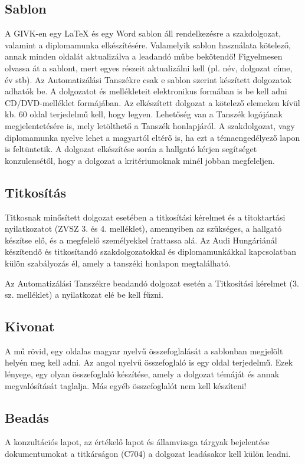 \subsection{Sablon}
A GIVK-en egy \LaTeX{} és egy Word sablon áll rendelkezésre a szakdolgozat, valamint a diplomamunka elkészítésére. Valamelyik sablon használata kötelező, annak minden oldalát aktualizálva a leadandó műbe bekötendő! Figyelmesen olvassa át a sablont, mert egyes részeit aktualizálni kell (pl. név, dolgozat címe, év stb). Az Automatizálási Tanszékre csak e sablon szerint készített dolgozatok adhatók be. A dolgozatot és mellékleteit elektronikus formában is be kell adni CD/DVD-melléklet formájában. Az elkészített dolgozat a kötelező elemeken kívül kb. 60 oldal terjedelmű kell, hogy legyen. Lehetőség van a Tanszék logójának megjelentetésére is, mely letölthető a Tanszék honlapjáról. A szakdolgozat, vagy diplomamunka nyelve lehet a magyartól eltérő is, ha ezt a témaengedélyező lapon is feltüntetik. A dolgozat elkészítése során a hallgató kérjen segítséget konzulensétől, hogy a dolgozat a kritériumoknak minél jobban megfeleljen. 

\subsection{Titkosítás}
Titkosnak minősített dolgozat esetében a titkosítási kérelmet és a titoktartási nyilatkozatot (ZVSZ 3. és 4. melléklet), amennyiben az szükséges, a hallgató készítse elő, és a megfelelő személyekkel írattassa alá. Az Audi Hungáriánál készítendő és titkosítandó szakdolgozatokkal és diplomamunkákkal kapcsolatban külön szabályozás él, amely a tanszéki honlapon megtalálható.

 Az Automatizálási Tanszékre beadandó dolgozat esetén a Titkosítási kérelmet (3. sz. melléklet) a nyilatkozat elé be kell fűzni. 

\subsection{Kivonat}
A mű  rövid, egy oldalas magyar  nyelvű összefoglalását a sablonban megjelölt helyén meg kell adni. Az angol nyelvű összefoglaló is egy oldal terjedelmű. Ezek lényege, egy olyan összefoglaló készítése, amely a dolgozat témáját és annak megvalósítását taglalja. Más egyéb összefoglalót nem kell készíteni!

\subsection{Beadás}
A konzultációs lapot, az értékelő lapot és államvizsga tárgyak bejelentése dokumentumokat a titkárságon (C704)  a dolgozat leadásakor  kell külön leadni.


